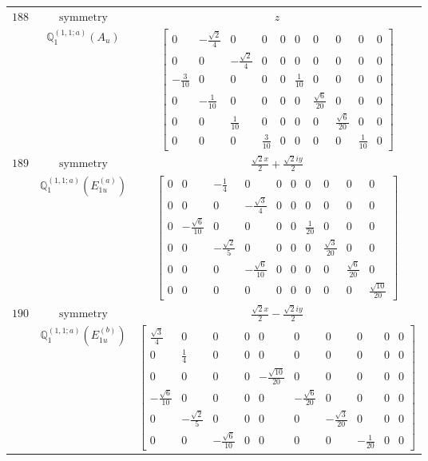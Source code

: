 \documentclass[fleqn,8pt,landscape]{jsarticle}
\begin{document}
\begin{longtable}{ccc}
$ 188 $ & $ \text{symmetry} $ & $ z $ \\
$  $ & $ \mathbb{Q}_{1}^{(1,1;a)}(A_{u}) $ & $ \begin{bmatrix} 0 & - \frac{\sqrt{2}}{4} & 0 & 0 & 0 & 0 & 0 & 0 & 0 & 0 \\ 0 & 0 & - \frac{\sqrt{2}}{4} & 0 & 0 & 0 & 0 & 0 & 0 & 0 \\ - \frac{3}{10} & 0 & 0 & 0 & 0 & \frac{1}{10} & 0 & 0 & 0 & 0 \\ 0 & - \frac{1}{10} & 0 & 0 & 0 & 0 & \frac{\sqrt{6}}{20} & 0 & 0 & 0 \\ 0 & 0 & \frac{1}{10} & 0 & 0 & 0 & 0 & \frac{\sqrt{6}}{20} & 0 & 0 \\ 0 & 0 & 0 & \frac{3}{10} & 0 & 0 & 0 & 0 & \frac{1}{10} & 0 \end{bmatrix} $ \\ \hline
$ 189 $ & $ \text{symmetry} $ & $ \frac{\sqrt{2} x}{2} + \frac{\sqrt{2} i y}{2} $ \\
$  $ & $ \mathbb{Q}_{1}^{(1,1;a)}(E_{1u}^{(a)}) $ & $ \begin{bmatrix} 0 & 0 & - \frac{1}{4} & 0 & 0 & 0 & 0 & 0 & 0 & 0 \\ 0 & 0 & 0 & - \frac{\sqrt{3}}{4} & 0 & 0 & 0 & 0 & 0 & 0 \\ 0 & - \frac{\sqrt{6}}{10} & 0 & 0 & 0 & 0 & \frac{1}{20} & 0 & 0 & 0 \\ 0 & 0 & - \frac{\sqrt{2}}{5} & 0 & 0 & 0 & 0 & \frac{\sqrt{3}}{20} & 0 & 0 \\ 0 & 0 & 0 & - \frac{\sqrt{6}}{10} & 0 & 0 & 0 & 0 & \frac{\sqrt{6}}{20} & 0 \\ 0 & 0 & 0 & 0 & 0 & 0 & 0 & 0 & 0 & \frac{\sqrt{10}}{20} \end{bmatrix} $ \\ \hline
$ 190 $ & $ \text{symmetry} $ & $ \frac{\sqrt{2} x}{2} - \frac{\sqrt{2} i y}{2} $ \\
$  $ & $ \mathbb{Q}_{1}^{(1,1;a)}(E_{1u}^{(b)}) $ & $ \begin{bmatrix} \frac{\sqrt{3}}{4} & 0 & 0 & 0 & 0 & 0 & 0 & 0 & 0 & 0 \\ 0 & \frac{1}{4} & 0 & 0 & 0 & 0 & 0 & 0 & 0 & 0 \\ 0 & 0 & 0 & 0 & - \frac{\sqrt{10}}{20} & 0 & 0 & 0 & 0 & 0 \\ - \frac{\sqrt{6}}{10} & 0 & 0 & 0 & 0 & - \frac{\sqrt{6}}{20} & 0 & 0 & 0 & 0 \\ 0 & - \frac{\sqrt{2}}{5} & 0 & 0 & 0 & 0 & - \frac{\sqrt{3}}{20} & 0 & 0 & 0 \\ 0 & 0 & - \frac{\sqrt{6}}{10} & 0 & 0 & 0 & 0 & - \frac{1}{20} & 0 & 0 \end{bmatrix} $ \\ \hline

\end{longtable}
\end{document}
